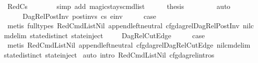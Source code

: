 \begin{isabellebody}
\ RedCs{}\isanewline
\ \ \ \ \ \ \isamarkupfalse%
\ {\isacharparenleft}{\kern0pt}simp\ add{\isacharcolon}{\kern0pt}\ magic{\isacharunderscore}{\kern0pt}stays{\isacharunderscore}{\kern0pt}cmd{\isacharunderscore}{\kern0pt}list{\isacharparenright}{\kern0pt}\isanewline
\ \ \ \ \isamarkupfalse%
\ {\isacharquery}{\kern0pt}thesis\ \isanewline
\ \ \ \ \ \ \isamarkupfalse%
\ auto\ \ \ \ \ \isanewline
\ \ \isamarkupfalse%
\isanewline
{}\isamarkupfalse%
\isanewline
\ \isamarkupfalse%
\ {\isacharparenleft}{\kern0pt}DagRel{\isacharunderscore}{\kern0pt}PostInv\ post{\isacharunderscore}{\kern0pt}invs\ cs{}\ e{\isacharunderscore}{\kern0pt}inv{\isacharparenright}{\kern0pt}\isanewline
\ \ \isamarkupfalse%
\ \isamarkupfalse%
\ {\isacharquery}{\kern0pt}case\ \isanewline
\ \ \ \ \isamarkupfalse%
\ {\isacharparenleft}{\kern0pt}metis\ {\isacharparenleft}{\kern0pt}full{\isacharunderscore}{\kern0pt}types{\isacharparenright}{\kern0pt}\ RedCmdListNil\ append{\isachardot}{\kern0pt}left{\isacharunderscore}{\kern0pt}neutral\ cfg{\isacharunderscore}{\kern0pt}dag{\isacharunderscore}{\kern0pt}rel{\isachardot}{\kern0pt}DagRel{\isacharunderscore}{\kern0pt}PostInv\ nil{\isacharunderscore}{\kern0pt}cmd{\isacharunderscore}{\kern0pt}elim\ state{\isachardot}{\kern0pt}distinct{\isacharparenleft}{\kern0pt}{}{\isacharparenright}{\kern0pt}\ state{\isachardot}{\kern0pt}inject{\isacharparenright}{\kern0pt}\isanewline
{}\isamarkupfalse%
\isanewline
\ \ \isamarkupfalse%
\ \ DagRel{\isacharunderscore}{\kern0pt}CutEdge\isanewline
\ \ \isamarkupfalse%
\ \isamarkupfalse%
\ {\isacharquery}{\kern0pt}case\ \ \ \ \ \isanewline
\ \ \ \ \isamarkupfalse%
\ {\isacharparenleft}{\kern0pt}metis\ RedCmdListNil\ append{\isachardot}{\kern0pt}left{\isacharunderscore}{\kern0pt}neutral\ cfg{\isacharunderscore}{\kern0pt}dag{\isacharunderscore}{\kern0pt}rel{\isachardot}{\kern0pt}DagRel{\isacharunderscore}{\kern0pt}CutEdge\ nil{\isacharunderscore}{\kern0pt}cmd{\isacharunderscore}{\kern0pt}elim\ state{\isachardot}{\kern0pt}distinct{\isacharparenleft}{\kern0pt}{}{\isacharparenright}{\kern0pt}\ state{\isachardot}{\kern0pt}inject{\isacharparenright}{\kern0pt}\isanewline
{}\isamarkupfalse%
\ {\isacharparenleft}{\kern0pt}auto\ intro{\isacharcolon}{\kern0pt}\ RedCmdListNil\ cfg{\isacharunderscore}{\kern0pt}dag{\isacharunderscore}{\kern0pt}rel{\isachardot}{\kern0pt}intros{\isacharparenright}{\kern0pt}%

\end{isabellebody}
